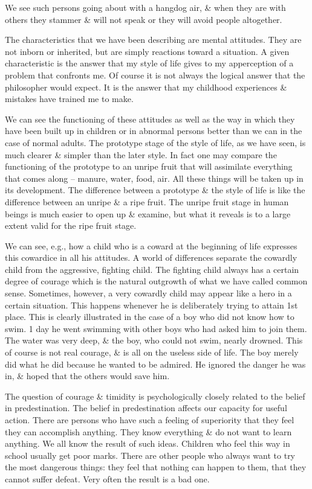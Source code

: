 \documentclass{article}
\numberwithin{equation}{section}
\begin{document}
We see such persons going about with a hangdog air, \& when they are with others they stammer \& will not speak or they will avoid people altogether.

The characteristics that we have been describing are mental attitudes. They are not inborn or inherited, but are simply reactions toward a situation. A given characteristic is the answer that my style of life gives to my apperception of a problem that confronts me. Of course it is not always the logical answer that the philosopher would expect. It is the answer that my childhood experiences \& mistakes have trained me to make.

We can see the functioning of these attitudes as well as the way in which they have been built up in children or in abnormal persons better than we can in the case of normal adults. The prototype stage of the style of life, as we have seen, is much clearer \& simpler than the later style. In fact one may compare the functioning of the prototype to an unripe fruit that will assimilate everything that comes along -- manure, water, food, air. All these things will be taken up in its development. The difference between a prototype \& the style of life is like the difference between an unripe \& a ripe fruit. The unripe fruit stage in human beings is much easier to open up \& examine, but what it reveals is to a large extent valid for the ripe fruit stage.

We can see, e.g., how a child who is a coward at the beginning of life expresses this cowardice in all his attitudes. A world of differences separate the cowardly child from the aggressive, fighting child. The fighting child always has a certain degree of courage which is the natural outgrowth of what we have called common sense. Sometimes, however, a very cowardly child may appear like a hero in a certain situation. This happens whenever he is deliberately trying to attain 1st place. This is clearly illustrated in the case of a boy who did not know how to swim. 1 day he went swimming with other boys who had asked him to join them. The water was very deep, \& the boy, who could not swim, nearly drowned. This of course is not real courage, \& is all on the useless side of life. The boy merely did what he did because he wanted to be admired. He ignored the danger he was in, \& hoped that the others would save him.

The question of courage \& timidity is psychologically closely related to the belief in predestination. The belief in predestination affects our capacity for useful action. There are persons who have such a feeling of superiority that they feel they can accomplish anything. They know everything \& do not want to learn anything. We all know the result of such ideas. Children who feel this way in school usually get poor marks. There are other people who always want to try the most dangerous things: they feel that nothing can happen to them, that they cannot suffer defeat. Very often the result is a bad one.
\end{document}
